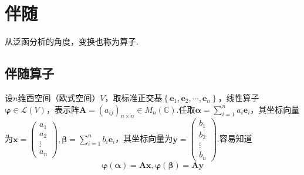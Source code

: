 \newpage
\section{伴随}
从泛函分析的角度，变换也称为算子.
\subsection{伴随算子}
设$n$维酉空间（欧式空间）$V$，取标准正交基$\left\{
    \bm{e}_1,\bm{e}_2,\cdots,\bm{e}_n
    \right\}$，线性算子$\bm{\varphi}\in \mathcal{L}\left(V\right)$，表示阵$\displaystyle\bm{A}=\left(a_{ij}\right)_{n\times n}\in M_n\left(\mathbb{C}\right)$.任取$\displaystyle\bm{\alpha}=\sum_{i=1}^{n}a_i\bm{e}_i$，其坐标向量为$\bm{x}=\begin{pmatrix}
        a_1 \\a_2\\\vdots\\a_n
    \end{pmatrix},
    \bm{\beta}=\sum_{i=1}^{n}b_i\bm{e}_i
$，其坐标向量为$\bm{y}=\begin{pmatrix}
        b_1 \\b_2\\\vdots\\b_n
    \end{pmatrix}$.容易知道\[
    \bm{\varphi}\left(\bm{\alpha}\right)=\bm{Ax},\bm{\varphi}\left(\bm{\beta}\right)=\bm{Ay}
\]

